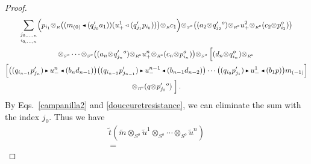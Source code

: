 \documentclass[reqno, a4paper, 10pt]{amsart}
\numberwithin{equation}{section}
\theoremstyle{plain}
\theoremstyle{definition}
\theoremstyle{remark}
\begin{document}
\begin{proof}
\begin{multline*}
 \underset{\underset{i_{0,\ldots, n}}{j_{0,\ldots, n}}}{\sum} \Big( p_{i_1}{\otimes_{\scriptscriptstyle{{R}}}} {\big( {(m_{(0)}{{\,\raise1pt\hbox{$\scriptscriptstyle{\blacktriangleleft}$} \, }} (q_{j_0}'a_1))(u_{+}^1 {{\,\raise1pt\hbox{$\scriptscriptstyle{\lhd}$} \, }} (q_{j_1}'p_{i_0}))} \big)}{\otimes_{\scriptscriptstyle{{R}}}}c_1\Big){\otimes_{\scriptscriptstyle{{S^{{{o}}}}}}}{\big( {(a_2{\otimes_{\scriptscriptstyle{{}}}}q_{j_2}'{}^o){\otimes_{\scriptscriptstyle{{\scriptscriptstyle{{R^{\rm e}}}}}}}u^2_{+}{\otimes_{\scriptscriptstyle{{\scriptscriptstyle{{R^{\rm e}}}}}}}(c_2{\otimes_{\scriptscriptstyle{{}}}}p_{i_2}^o)} \big)} \\ {\otimes_{\scriptscriptstyle{{S^{{{o}}}}}}} \cdots {\otimes_{\scriptscriptstyle{{S^{{{o}}}}}}}{\big( {(a_{n}{\otimes_{\scriptscriptstyle{{}}}}q_{j_{n}}'{}^o){\otimes_{\scriptscriptstyle{{\scriptscriptstyle{{R^{\rm e}}}}}}}u^{n}_{+}{\otimes_{\scriptscriptstyle{{\scriptscriptstyle{{R^{\rm e}}}}}}}(c_{n}{\otimes_{\scriptscriptstyle{{}}}}p_{i_n}^o)} \big)}  {\otimes_{\scriptscriptstyle{{S^{{{o}}}}}}} \left[\underset{}{} (d_{n}{\otimes_{\scriptscriptstyle{{}}}}q_{i_n}^o){\otimes_{\scriptscriptstyle{{\scriptscriptstyle{{R^{\rm e}}}}}}} \right. \\ \Big[ {\big( {(q_{i_{n-1}}p'_{j_n}){{\,\raise1pt\hbox{$\scriptscriptstyle{\blacktriangleright}$} \, }} u^{n}_{-} {{\,\raise1pt\hbox{$\scriptscriptstyle{\blacktriangleleft}$} \, }} (b_nd_{n-1})} \big)} {\big( {(q_{i_{n-2}}p'_{j_{n-1}}){{\,\raise1pt\hbox{$\scriptscriptstyle{\blacktriangleright}$} \, }} u^{n-1}_{-} {{\,\raise1pt\hbox{$\scriptscriptstyle{\blacktriangleleft}$} \, }} (b_{n-1}d_{n-2})} \big)} \cdots {\big( {(q_{i_{0}}p'_{j_{1}}){{\,\raise1pt\hbox{$\scriptscriptstyle{\blacktriangleright}$} \, }} u^{1}_{-} {{\,\raise1pt\hbox{$\scriptscriptstyle{\blacktriangleleft}$} \, }} (b_{1}p)} \big)}m_{(-1)} \Big] \\ {\otimes_{\scriptscriptstyle{{\scriptscriptstyle{{R^{\rm e}}}}}}}   
(q{\otimes_{\scriptscriptstyle{{}}}}p'_{j_0}{}^o) \left. \underset{}{} \right].
\end{multline*}
By Eqs.~\eqref{campanilla2} and \eqref{douceuretresistance}, we can eliminate the sum with the index $j_0$. Thus we have
\begin{multline*}
{\tilde{{t}}}({\tilde{{m}}}{\otimes_{\scriptscriptstyle{{S^{{{o}}}}}}}{\tilde{{u}}}^1{\otimes_{\scriptscriptstyle{{S^{{{o}}}}}}}\cdots{\otimes_{\scriptscriptstyle{{S^{{{o}}}}}}}{\tilde{{u}}}^n) \\ \,=\,

\end{multline*}
\end{proof}
\end{document}
